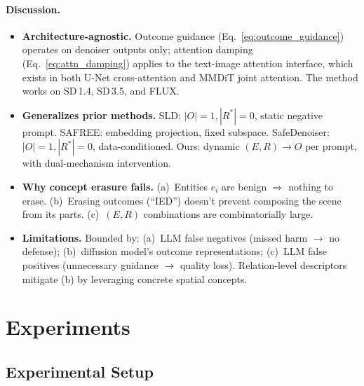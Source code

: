 \documentclass{article}
\begin{document}
\paragraph{Discussion.}
\begin{itemize}[leftmargin=*,itemsep=2pt]

\item \textbf{Architecture-agnostic.} Outcome guidance (Eq.~\ref{eq:outcome_guidance}) operates on denoiser outputs only; attention damping (Eq.~\ref{eq:attn_damping}) applies to the text-image attention interface, which exists in both U-Net cross-attention and MMDiT joint attention. The method works on SD\,1.4, SD\,3.5, and FLUX.

\item \textbf{Generalizes prior methods.} SLD: $|O|{=}1, |R^*|{=}0$, static negative prompt. SAFREE: embedding projection, fixed subspace. SafeDenoiser: $|O|{=}1, |R^*|{=}0$, data-conditioned. Ours: dynamic $(E, R) \to O$ per prompt, with dual-mechanism intervention.

\item \textbf{Why concept erasure fails.} (a)~Entities $e_i$ are benign $\Rightarrow$ nothing to erase. (b)~Erasing outcomes (``IED'') doesn't prevent composing the scene from its parts. (c)~$(E, R)$ combinations are combinatorially large.

\item \textbf{Limitations.} Bounded by: (a)~LLM false negatives (missed harm $\to$ no defense); (b)~diffusion model's outcome representations; (c)~LLM false positives (unnecessary guidance $\to$ quality loss). Relation-level descriptors mitigate (b) by leveraging concrete spatial concepts.

\end{itemize}


\section{Experiments}
\label{sec:exp}

\subsection{Experimental Setup}
\label{sec:setup}
\end{document}
